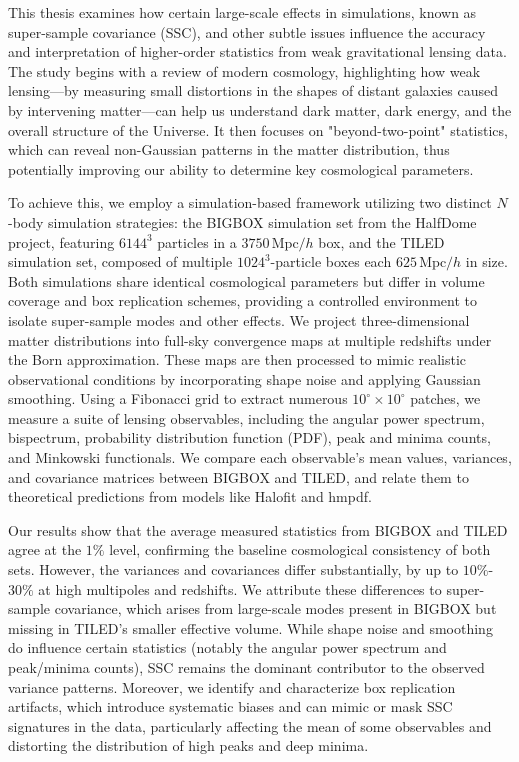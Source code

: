 This thesis examines how certain large-scale effects in simulations, known as super-sample covariance (SSC), and other subtle issues influence the accuracy and interpretation of higher-order statistics from weak gravitational lensing data. The study begins with a review of modern cosmology, highlighting how weak lensing—by measuring small distortions in the shapes of distant galaxies caused by intervening matter—can help us understand dark matter, dark energy, and the overall structure of the Universe. It then focuses on "beyond-two-point" statistics, which can reveal non-Gaussian patterns in the matter distribution, thus potentially improving our ability to determine key cosmological parameters.

To achieve this, we employ a simulation-based framework utilizing two distinct $N$-body simulation strategies: the BIGBOX simulation set from the HalfDome project, featuring $6144^3$ particles in a $3750\, \mathrm{Mpc}/h$ box, and the TILED simulation set, composed of multiple $1024^3$-particle boxes each $625\, \mathrm{Mpc}/h$ in size. Both simulations share identical cosmological parameters but differ in volume coverage and box replication schemes, providing a controlled environment to isolate super-sample modes and other effects. We project three-dimensional matter distributions into full-sky convergence maps at multiple redshifts under the Born approximation. These maps are then processed to mimic realistic observational conditions by incorporating shape noise and applying Gaussian smoothing. Using a Fibonacci grid to extract numerous $10^\circ \times 10^\circ$ patches, we measure a suite of lensing observables, including the angular power spectrum, bispectrum, probability distribution function (PDF), peak and minima counts, and Minkowski functionals. We compare each observable's mean values, variances, and covariance matrices between BIGBOX and TILED, and relate them to theoretical predictions from models like Halofit and hmpdf.

Our results show that the average measured statistics from BIGBOX and TILED agree at the $1\%$ level, confirming the baseline cosmological consistency of both sets. However, the variances and covariances differ substantially, by up to $10\%$-$30\%$ at high multipoles and redshifts. We attribute these differences to super-sample covariance, which arises from large-scale modes present in BIGBOX but missing in TILED's smaller effective volume. While shape noise and smoothing do influence certain statistics (notably the angular power spectrum and peak/minima counts), SSC remains the dominant contributor to the observed variance patterns. Moreover, we identify and characterize box replication artifacts, which introduce systematic biases and can mimic or mask SSC signatures in the data, particularly affecting the mean of some observables and distorting the distribution of high peaks and deep minima.

